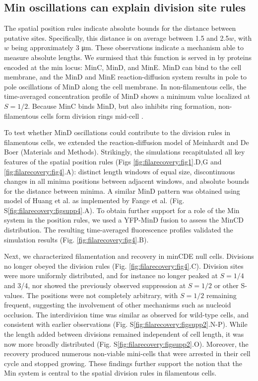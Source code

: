 \subsection{Min oscillations can explain division site rules}
The spatial position rules indicate absolute bounds for the distance between putative sites. Specifically, this distance is on average between 1.5 and 2.5$w$, with $w$ being approximately 3 μm. These observations indicate a mechanism able to measure absolute lengths. We surmised that this function is served in \ecoli by proteins encoded at the min locus: MinC, MinD, and MinE. MinD can bind to the cell membrane, and the MinD and MinE reaction-diffusion system results in pole to pole oscillations of MinD along the cell membrane. In non-filamentous cells, the time-averaged concentration profile of MinD shows a minimum value localized at $S = 1/2$. Because MinC binds MinD, but also inhibits ring formation, non-filamentous cells form division rings mid-cell \cite{Loose2011, Raskin1999}. 

To test whether MinD oscillations could contribute to the division rules in filamentous cells, we extended the reaction-diffusion model of Meinhardt and De Boer \cite{Meinhardt2001} (Materials and Methods). Strikingly, the simulations recapitulated all key features of the spatial position rules (Figs \ref{fig:filarecovery:fig1}.D,G and \ref{fig:filarecovery:fig4}.A): distinct length windows of equal size, discontinuous changes in all minima positions between adjacent windows, and absolute bounds for the distance between minima. A similar MinD pattern was obtained using model of Huang et al. \cite{Huang2003} as implemented by Fange et al. \cite{Hattne2005, Fange2006} (Fig. S\ref{fig:filarecovery:figsupp4}.A). To obtain further support for a role of the Min system in the position rules, we used a YFP-MinD fusion to assess the MinCD distribution. The resulting time-averaged fluorescence profiles validated the simulation results (Fig. \ref{fig:filarecovery:fig4}.B). 

Next, we characterized filamentation and recovery in minCDE null cells. Divisions no longer obeyed the division rules (Fig. \ref{fig:filarecovery:fig4}.C). Division sites were more uniformly distributed, and for instance no longer peaked at $S = 1/4$ and 3/4, nor showed the previously observed suppression at $S = 1/2$ or other S-values. The positions were not completely arbitrary, with $S = 1/2$ remaining frequent, suggesting the involvement of other mechanisms such as nucleoid occlusion. The interdivision time was similar as observed for wild-type cells, and consistent with earlier observations \cite{Donachie1996} (Fig. S\ref{fig:filarecovery:figsupp2}.N-P). While the length added between divisions remained independent of cell length, it was now more broadly distributed (Fig. S\ref{fig:filarecovery:figsupp2}.O). Moreover, the recovery produced numerous non-viable mini-cells \cite{Donachie1996, Adler1967} that were arrested in their cell cycle and stopped growing.  These findings further support the notion that the Min system is central to the spatial division rules in filamentous cells.

